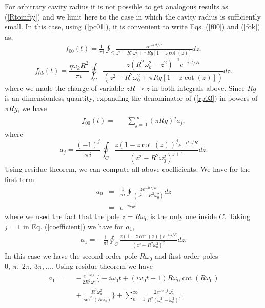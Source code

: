 \documentclass[10pt,english,twocolumn]{revtex4}
\begin{document}
For arbitrary cavity radius it is not possible to get analogous results as (\ref{Rtoinfty})  and we limit here to the case in which
the cavity radius is sufficiently small. In this case, using (\ref{pc01}), it is convenient to write  Eqs. (\ref{f00}) and (\ref{fok}) as,
%
\begin{eqnarray}
\label{rp03}
f_{00}(t)=\frac{1}{\pi i}\oint_C \frac{z e^{-izt/R}}{z^2-R^2\omega_0^2+\pi R g[1-z\cot(z)]}dz,
\end{eqnarray}
%
%
\begin{equation}
f_{0k}(t)=\frac{\eta\omega_k R^2}{\pi i}\oint_C
 \frac{z(R^2\omega_k^2-z^2)^{-1} e^{-izt/R}}{(z^2-R^2\omega_0^2+\pi R g[1-z\cot(z)])}dz.
\label{fok1}
\end{equation}
%
where we made the change of variable $zR\to z$  in both integrals above.  
Since $Rg$ is an dimensionless quantity, expanding the denominator of (\ref{rp03}) in powers of $\pi Rg$, we have
%
\begin{eqnarray}
\label{pc022}
f_ {00}(t)=&& \sum_{j=0}^\infty (\pi R g)^j a_j,
\label{f00exp}
\end{eqnarray}
%
where 
\begin{equation}
a_j=\frac{(-1)^j}{\pi i}\oint_C \frac { z(1 - z\cot (z))^je^{-itz/R}} {(z^2 -
     R^2\omega_ 0^2)^{j+1}} dz.
\label{coefficient}
\end{equation}
%
Using residue theorem, we can compute all above coefficients. We have for the first term
\begin{eqnarray}
a_0&=&\frac{1}{\pi i}\oint \frac { ze^{-itz/R}} {(z^2 -
     R^2\omega_ 0^2)} dz\nonumber\\
&=&e^{-i\omega_0 t}
\label{a0}
\end{eqnarray}
%
where we used the fact that the pole $z=R\omega_0$ is the only one inside $C$. Taking $j=1$ in Eq. (\ref{coefficient}) we have
for $a_1$,
%
\begin{eqnarray}
a_1=-\frac{1}{\pi i}\oint_C \frac { z(1 - z\cot (z))e^{-itz/R}} 
{(z^2 -     R^2\omega_ 0^2)^{2}} dz.
\end{eqnarray}
%
In this case we have the second  order  pole $R\omega_0$ and first order poles $0,~\pi,~2\pi,~3\pi,...$. Using residue theorem
we have
\begin{eqnarray}
a_1=&&-\frac{e^{-i \omega_0 t}}{2 R^2\omega_0^2} \bigg\{-i \omega_0 t+ (i\omega_0 t-1) R\omega_0 \cot(R \omega_0)\nonumber\\
&&+\frac{R^2\omega_0^2}{\sin^2(R \omega_0)}\bigg\}
+\sum_{n=1}^{\infty}\frac{2 e^{-i\omega_n t} \omega_n^2}{R^2(\omega_n^2 -\omega_0^2)^2}.
\label{a1}
\end{eqnarray}
\end{document}
